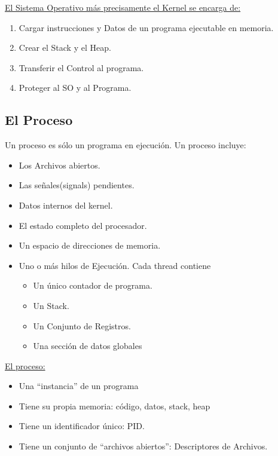 \documentclass[../main.tex]{subfiles}
\begin{document}
        \underline{El Sistema Operativo más precisamente el Kernel se encarga de:}
        \begin{enumerate}
            \item Cargar instrucciones y Datos de un programa ejecutable en memoria.
            \item Crear el Stack y el Heap.
            \item Transferir el Control al programa.
            \item Proteger al SO y al Programa.
        \end{enumerate}

    \subsection{El Proceso}
        Un proceso es sólo un programa en ejecución. Un proceso incluye:
        \begin{itemize}
            \item Los Archivos abiertos.
            \item Las señales(signals) pendientes.
            \item Datos internos del kernel.
            \item El estado completo del procesador.
            \item Un espacio de direcciones de memoria.
            \item Uno o más hilos de Ejecución. Cada thread contiene
                \begin{itemize}
                    \item Un único contador de programa.
                    \item Un Stack.
                    \item Un Conjunto de Registros.
                    \item Una sección de datos globales
                \end{itemize}    
        \end{itemize}
        
      
        \underline{El proceso:}
        \begin{itemize}
            \item Una “instancia” de un programa
            \item Tiene su propia memoria: código, datos, stack, heap
            \item Tiene un identificador único: PID.
            \item Tiene un conjunto de “archivos abiertos”: Descriptores de Archivos.
        \end{itemize}
        
\end{document}
